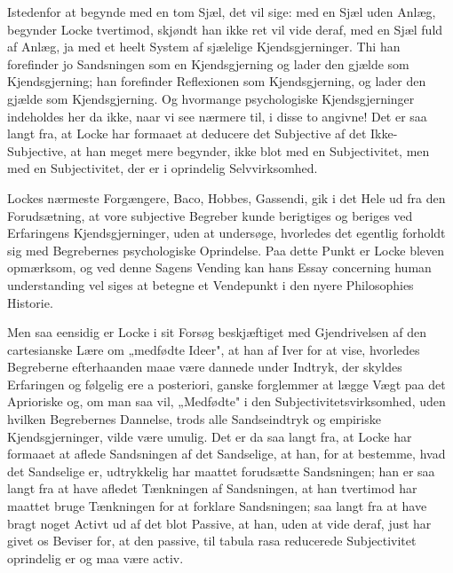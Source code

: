 \documentclass[12pt]{book}
\newcommand{\opage}[1]{\marginnote{\footnotesize\textit{[#1]}}}
\begin{document}
Istedenfor at begynde med en tom Sjæl, det vil sige: med en Sjæl uden Anlæg,
begynder Locke tvertimod, skjøndt han ikke ret vil vide deraf, med en Sjæl fuld af
Anlæg, ja med et heelt System af sjælelige Kjendsgjerninger. Thi han forefinder jo
Sandsningen som en Kjendsgjerning og lader den gjælde som Kjendsgjerning; han
forefinder Reflexionen som Kjendsgjerning, og lader den gjælde som Kjendsgjerning.
Og hvormange psychologiske Kjendsgjerninger indeholdes her da ikke, naar vi see
nærmere til, i disse to angivne! Det er saa langt fra, at Locke har formaaet at
deducere det Subjective af det Ikke-Subjective, at han meget mere begynder, ikke
blot med en Subjectivitet, men med en Subjectivitet, der er i oprindelig
Selvvirksomhed.

Lockes nærmeste Forgængere, Baco, Hobbes, Gassendi, gik i det Hele ud fra den
Forudsætning, at vore subjective Begreber kunde berigtiges og beriges ved
Erfaringens Kjendsgjerninger, uden at undersøge, hvorledes det egentlig forholdt sig
med Begrebernes psychologiske Oprindelse. Paa dette Punkt er Locke bleven
opmærksom, og ved denne Sagens Vending kan hans Essay concerning human understanding
vel siges at betegne et Vendepunkt i den nyere Philosophies Historie.

Men saa eensidig er Locke i sit Forsøg beskjæftiget med Gjendrivelsen af den
cartesianske Lære om „medfødte Ideer", at han af Iver for at vise, hvorledes
Begreberne efterhaanden maae være dannede under Indtryk, der skyldes Erfaringen og
følgelig ere a posteriori, ganske forglemmer at lægge Vægt paa det Aprioriske og,
om man saa vil, „Medfødte" i den Subjectivitetsvirksomhed, uden hvilken Begrebernes
Dannelse, trods alle Sandseindtryk og empiriske Kjendsgjerninger, vilde være
\opage{26} umulig. Det er da saa langt fra, at Locke har formaaet at aflede Sandsningen af det
Sandselige, at han, for at bestemme, hvad det Sandselige er, udtrykkelig har maattet
forudsætte Sandsningen; han er saa langt fra at have afledet Tænkningen af
Sandsningen, at han tvertimod har maattet bruge Tænkningen for at forklare
Sandsningen; saa langt fra at have bragt noget Activt ud af det blot Passive, at han,
uden at vide deraf, just har givet os Beviser for, at den passive, til tabula rasa
reducerede Subjectivitet oprindelig er og maa være activ.
\end{document}
